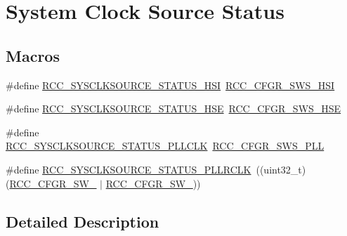 \hypertarget{group___r_c_c___system___clock___source___status}{}\section{System Clock Source Status}
\label{group___r_c_c___system___clock___source___status}
\subsection*{Macros}
\begin{DoxyCompactItemize}
\item 
\#define \hyperlink{group___r_c_c___system___clock___source___status_ga0d6c2b0b2d59e6591295649853bb2abd}{R\+C\+C\+\_\+\+S\+Y\+S\+C\+L\+K\+S\+O\+U\+R\+C\+E\+\_\+\+S\+T\+A\+T\+U\+S\+\_\+\+H\+SI}~\hyperlink{group___peripheral___registers___bits___definition_ga6764639cf221e1ebc0b5448dcaed590a}{R\+C\+C\+\_\+\+C\+F\+G\+R\+\_\+\+S\+W\+S\+\_\+\+H\+SI}
\item 
\#define \hyperlink{group___r_c_c___system___clock___source___status_ga3847769265bf19becf7b976a7e908a64}{R\+C\+C\+\_\+\+S\+Y\+S\+C\+L\+K\+S\+O\+U\+R\+C\+E\+\_\+\+S\+T\+A\+T\+U\+S\+\_\+\+H\+SE}~\hyperlink{group___peripheral___registers___bits___definition_gae09a0202f441c1a43e69c62331d50a08}{R\+C\+C\+\_\+\+C\+F\+G\+R\+\_\+\+S\+W\+S\+\_\+\+H\+SE}
\item 
\#define \hyperlink{group___r_c_c___system___clock___source___status_ga4f05019ec09da478d084f44dbaad7d6d}{R\+C\+C\+\_\+\+S\+Y\+S\+C\+L\+K\+S\+O\+U\+R\+C\+E\+\_\+\+S\+T\+A\+T\+U\+S\+\_\+\+P\+L\+L\+C\+LK}~\hyperlink{group___peripheral___registers___bits___definition_ga2c67e2279804a83ef24438267d9d4a6c}{R\+C\+C\+\_\+\+C\+F\+G\+R\+\_\+\+S\+W\+S\+\_\+\+P\+LL}
\item 
\#define \hyperlink{group___r_c_c___system___clock___source___status_gafb2aec046cc6759c3b290a3eeebe7d75}{R\+C\+C\+\_\+\+S\+Y\+S\+C\+L\+K\+S\+O\+U\+R\+C\+E\+\_\+\+S\+T\+A\+T\+U\+S\+\_\+\+P\+L\+L\+R\+C\+LK}~((uint32\+\_\+t)(\hyperlink{group___peripheral___registers___bits___definition_ga99f08d86fd41824058a7fdf817f7e2fd}{R\+C\+C\+\_\+\+C\+F\+G\+R\+\_\+\+S\+W\+\_} $\vert$ \hyperlink{group___peripheral___registers___bits___definition_ga72d51cb5d66ee1aa4d2c6f14796a072f}{R\+C\+C\+\_\+\+C\+F\+G\+R\+\_\+\+S\+W\+\_}))
\end{DoxyCompactItemize}


\subsection{Detailed Description}


